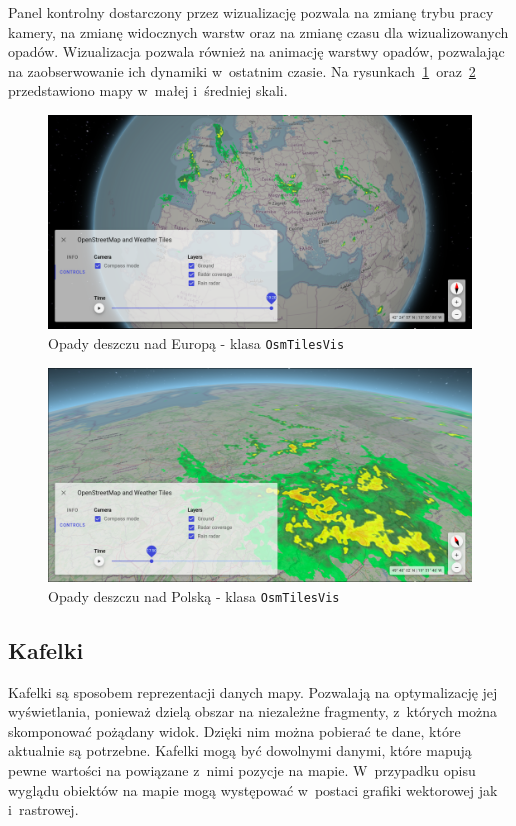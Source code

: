 Panel kontrolny dostarczony przez wizualizację pozwala na zmianę trybu pracy kamery, na zmianę widocznych warstw oraz na zmianę czasu dla wizualizowanych opadów. Wizualizacja pozwala również na animację warstwy opadów, pozwalając na zaobserwowanie ich dynamiki w~ostatnim czasie. Na rysunkach~\ref{fig:c4_osmTilesVis}~oraz~\ref{fig:c4_osmTilesVis_1} przedstawiono mapy w~małej i~średniej skali.
\begin{figure}[h]
  \centering
  \includegraphics[width=\linewidth]{img/c4_osmTilesVis.png}
  \caption{Opady deszczu nad Europą - klasa \texttt{OsmTilesVis}}
  \label{fig:c4_osmTilesVis} 
\end{figure}

\begin{figure}[h]
  \centering
  \includegraphics[width=\linewidth]{img/c4_osmTilesVis_1.png}
  \caption{Opady deszczu nad Polską - klasa \texttt{OsmTilesVis}}
  \label{fig:c4_osmTilesVis_1} 
\end{figure}

\subsection{Kafelki}
Kafelki są sposobem reprezentacji danych mapy. Pozwalają na optymalizację jej wyświetlania, ponieważ dzielą obszar na niezależne fragmenty, z~których można skomponować pożądany widok. Dzięki nim można pobierać te dane, które aktualnie są potrzebne. Kafelki mogą być dowolnymi danymi, które mapują pewne wartości na powiązane z~nimi pozycje na mapie. W~przypadku opisu wyglądu obiektów na mapie mogą występować w~postaci grafiki wektorowej jak i~rastrowej.

